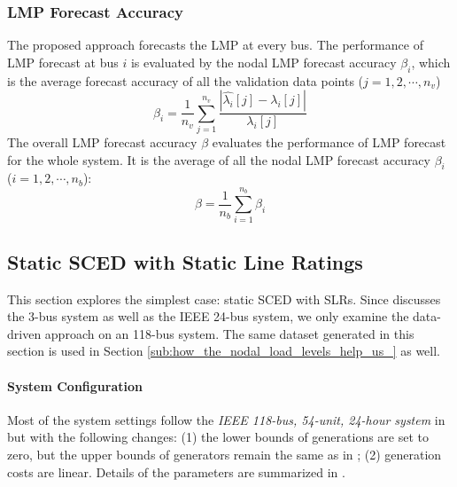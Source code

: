 \documentclass[letterpaper, 11pt]{article}
\theoremstyle{plain}
\theoremstyle{definition}
\begin{document}
\subsubsection{LMP Forecast Accuracy} \label{ssub:lmp_forecast_accuracy}
The proposed approach forecasts the LMP at every bus. The performance of LMP forecast at bus $i$ is evaluated by the nodal LMP forecast accuracy $\beta_i$, which is the average forecast accuracy of all the validation data points ($j=1,2,\cdots,n_v$)
\begin{equation}
\label{eqn: LMP_accu_nodal}
\beta_i =  \frac{1}{n_v} \sum_{j=1}^{n_v}{ \frac{ | \hat{\lambda_i}[j] - \lambda_i[j]| }{ \lambda_i[j] } }
\end{equation}
The overall LMP forecast accuracy $\beta$ evaluates the performance of LMP forecast for the whole system. It is the average of all the nodal LMP forecast accuracy $\beta_i$ ($i=1,2,\cdots,n_b$):
\begin{equation}
\label{eqn: LMP_accu_overall}
\beta =  \frac{1}{n_b} \sum_{i=1}^{n_b} \beta_i
\end{equation}






\subsection{Static SCED with Static Line Ratings} \label{sub:case_studies_of_static_sced_with_static_line_ratings}
This section explores the simplest case: static SCED with SLRs. Since \cite{Geng2015} discusses the 3-bus system as well as the IEEE 24-bus system, we only examine the data-driven approach on an 118-bus system. The same dataset generated in this section is used in Section \ref{sub:how_the_nodal_load_levels_help_us_} as well.

\paragraph{System Configuration} \label{par:system_configuration}
Most of the system settings follow the \emph{IEEE 118-bus, 54-unit, 24-hour system} in \cite{Technology} but with the following changes: (1) the lower bounds of generations are set to zero, but the upper bounds of generators remain the same as in \cite{Technology}; (2) generation costs are linear. Details of the parameters are summarized in \cite{Geng2015c}.
\end{document}
